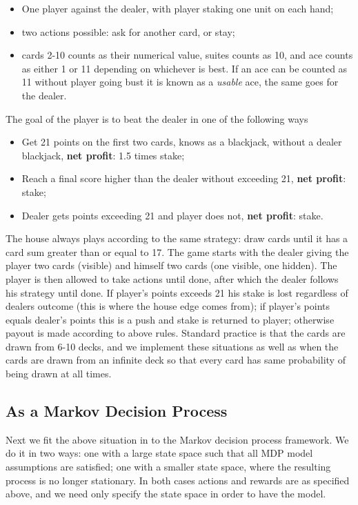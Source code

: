 \begin{itemize}
	\item One player against the dealer, with player staking one unit on each hand;
	\item two actions possible: ask for another card, or stay;
	\item cards 2-10 counts as their numerical value, suites counts as 10, and ace counts as either 1 or 11 depending on whichever is best. If an ace can be counted as 11 without player going bust it is known as a \textit{usable} ace, the same goes for the dealer.
\end{itemize}
The goal of the player is to beat the dealer in one of the following ways
\begin{itemize}
	\item Get 21 points on the first two cards, knows as a blackjack, without a dealer blackjack, \textbf{net profit}: 1.5 times stake;
	\item Reach a final score higher than the dealer without exceeding 21,\textbf{ net profit}: stake;
	\item Dealer gets points exceeding 21 and player does not, \textbf{net profit}: stake.
\end{itemize}
The house always plays according to the same strategy: draw cards until it has a card sum greater than or equal to 17. The game starts with the dealer giving the player two cards (visible) and himself two cards (one visible, one hidden). The player is then allowed to take actions until done, after which the dealer follows his strategy until done. If player's points exceeds 21 his stake is lost regardless of dealers outcome (this is where the house edge comes from); if player's points equals dealer's points this is a push and stake is returned to player; otherwise payout is made according to above rules. Standard practice is that the cards are drawn from 6-10 decks, and we implement these situations as well as when the cards are drawn from an infinite deck so that every card has same probability of being drawn at all times.

\subsection*{As a Markov Decision Process}
Next we fit the above situation in to the Markov decision process framework. We do it in two ways: one with a large state space such that all MDP model assumptions are satisfied; one with a smaller state space,
where the resulting process is  no longer stationary. In both cases actions and rewards are as specified above, and we need only specify the state space in order to have the model.

